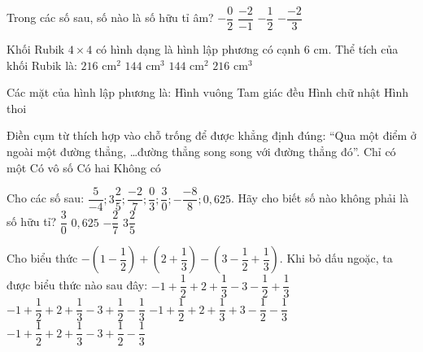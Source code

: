 \documentclass[12pt,a4paper]{article}
\begin{document}
\begin{ex}
Trong các số sau, số nào là số hữu tỉ âm?
\choice
{$-\dfrac{0}{2}$}
{$\dfrac{-2}{-1}$}
{\True $-\dfrac{1}{2}$}
{$-\dfrac{-2}{3}$}
\end{ex}

\begin{ex}
Khối Rubik $4 \times 4$ có hình dạng là hình lập phương có cạnh $6\text{ cm}$. Thể tích của khối Rubik là:
\choice
{$216\text{ cm}^2$}
{$144\text{ cm}^3$}
{$144\text{ cm}^2$}
{\True $216\text{ cm}^3$}
\end{ex}

\begin{ex}
Các mặt của hình lập phương là:
\choice
{\True Hình vuông}
{Tam giác đều}
{Hình chữ nhật}
{Hình thoi}
\end{ex}

\begin{ex}
Điền cụm từ thích hợp vào chỗ trống để được khẳng định đúng: “Qua một điểm ở ngoài một đường thẳng, \dots đường thẳng song song với đường thẳng đó”.
\choice
{\True Chỉ có một}
{Có vô số}
{Có hai}
{Không có}
\end{ex}

\begin{ex}
Cho các số sau: $\dfrac{5}{-4}; 3\dfrac{2}{5}; \dfrac{-2}{7}; \dfrac{0}{3}; \dfrac{3}{0}; -\dfrac{-8}{8}; 0{,}625$. Hãy cho biết số nào không phải là số hữu tỉ?
\choice
{\True $\dfrac{3}{0}$}
{$0{,}625$}
{$-\dfrac{2}{7}$}
{$3\dfrac{2}{5}$}
\end{ex}

\begin{ex}
Cho biểu thức $-\left(1-\dfrac{1}{2}\right)+\left(2+\dfrac{1}{3}\right)-\left(3-\dfrac{1}{2}+\dfrac{1}{3}\right)$. Khi bỏ dấu ngoặc, ta được biểu thức nào sau đây:
\choice
{$-1+\dfrac{1}{2}+2+\dfrac{1}{3}-3-\dfrac{1}{2}+\dfrac{1}{3}$}
{\True $-1+\dfrac{1}{2}+2+\dfrac{1}{3}-3+\dfrac{1}{2}-\dfrac{1}{3}$}
{$-1+\dfrac{1}{2}+2+\dfrac{1}{3}+3-\dfrac{1}{2}-\dfrac{1}{3}$}
{$-1+\dfrac{1}{2}+2+\dfrac{1}{3}-3+\dfrac{1}{2}-\dfrac{1}{3}$}
\end{ex}
\end{document}
